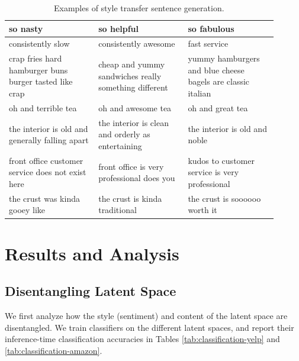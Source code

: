 \documentclass[letterpaper]{article} %
\begin{document}
\begin{table}[ht]
\begin{tabular}{| p{0.3\linewidth} || p{0.3\linewidth} | p{0.3\linewidth} |}
		\hline
		\hline
		so nasty                                               & so helpful                                                     & so fabulous                                                 \\
		\hline
		consistently slow                                      & consistently awesome                                           & fast service                                                \\
		\hline
		crap fries hard hamburger buns burger tasted like crap & cheap and yummy sandwiches really something different          & yummy hamburgers and blue cheese bagels are classic italian \\
		\hline
		oh and terrible tea                                    & oh and awesome tea                                             & oh and great tea                                            \\
		\hline
		the interior is old and generally falling apart        & the interior is clean and orderly as entertaining              & the interior is old and noble                               \\
		\hline
		front office customer service does not exist here      & front office is very professional does you                     & kudos to customer service is very professional              \\
		\hline
		the crust was kinda gooey like                         & the crust is kinda traditional                                 & the crust is soooooo worth it                               \\
		\hline
	\end{tabular}
	\caption{Examples of style transfer sentence generation.}
	\label{tab:transfer-samples}
\end{table}

\section{Results and Analysis}

\subsection{Disentangling Latent Space}

We first analyze how the style (sentiment) and content of the latent space are disentangled.
We train classifiers on the different latent spaces, and report their inference-time classification accuracies in Tables \ref{tab:classification-yelp} and \ref{tab:classification-amazon}.
\end{document}
